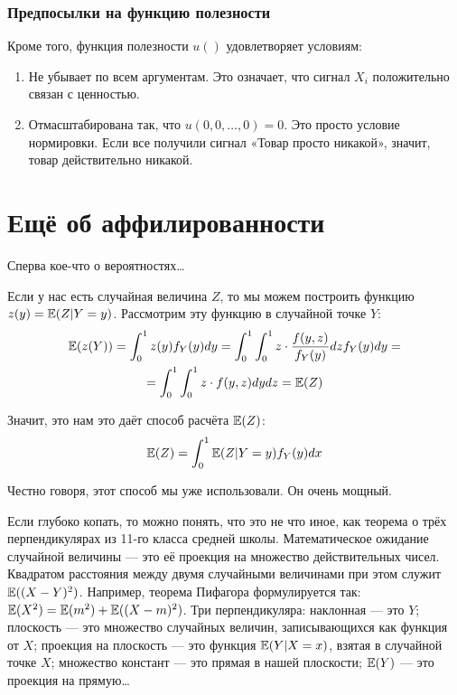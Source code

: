 \subsubsection*{Предпосылки на функцию полезности}
Кроме того, функция полезности $ u() $ удовлетворяет условиям:
\begin{enumerate}
\item Не убывает по всем аргументам. Это означает, что сигнал $ X_{i} $ положительно связан с ценностью.
\item Отмасштабирована так, что $ u(0,0,\ldots,0)=0 $. Это просто условие нормировки. Если все получили сигнал «Товар просто никакой», значит, товар действительно никакой.
\end{enumerate}






\section{Ещё об аффилированности}


Сперва кое-что о вероятностях\ldots

Если у нас есть случайная величина $ Z $, то мы можем построить функцию $z(y)= \operatorname{\mathbb{E}}(Z|Y=y) $. Рассмотрим эту функцию в случайной точке $ Y $:
\begin{multline}
\operatorname{\mathbb{E}}(z(Y))=\int_{0}^{1}z(y)f_{Y}(y)dy=\int_{0}^{1}\int_{0}^{1}z\cdot \frac{f(y,z)}{f_{Y}(y)}dz f_{Y}(y)dy=\\
=\int_{0}^{1}\int_{0}^{1}z\cdot f(y,z)dydz=\operatorname{\mathbb{E}}(Z)
\end{multline}

Значит, это нам это даёт способ расчёта $ \operatorname{\mathbb{E}}(Z) $:
\begin{equation}
\label{conditional_way}
\operatorname{\mathbb{E}}(Z)=\int_{0}^{1}\operatorname{\mathbb{E}}(Z|Y=y)f_{Y}(y)dx
\end{equation}

Честно говоря, этот способ мы уже использовали. Он очень мощный.

Если глубоко копать, то можно понять, что это не что иное, как теорема о трёх перпендикулярах из 11-го класса средней школы. Математическое ожидание случайной величины — это её проекция на множество действительных чисел. Квадратом расстояния между двумя случайными величинами при этом служит $ \operatorname{\mathbb{E}}((X-Y)^{2}) $. Например, теорема Пифагора формулируется так: $ \operatorname{\mathbb{E}}(X^{2})=\operatorname{\mathbb{E}}(m^{2})+\operatorname{\mathbb{E}}((X-m)^{2}) $. Три перпендикуляра: наклонная — это $ Y $; плоскость — это множество случайных величин, записывающихся как функция от $ X $; проекция на плоскость — это функция $ \operatorname{\mathbb{E}}(Y|X=x) $, взятая в случайной точке $ X $; множество констант — это прямая в нашей плоскости; $ \operatorname{\mathbb{E}}(Y) $ — это проекция на прямую\ldots


